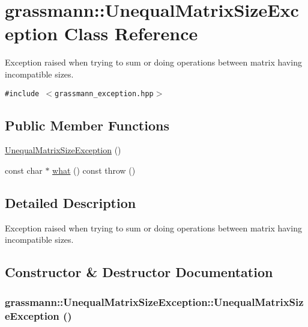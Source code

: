 \hypertarget{classgrassmann_1_1UnequalMatrixSizeException}{
\section{grassmann::UnequalMatrixSizeException Class Reference}
\label{classgrassmann_1_1UnequalMatrixSizeException}
}
Exception raised when trying to sum or doing operations between matrix having incompatible sizes.  


{\tt \#include $<$grassmann\_\-exception.hpp$>$}

\subsection*{Public Member Functions}
\begin{CompactItemize}
\item 
\hyperlink{classgrassmann_1_1UnequalMatrixSizeException_b0a801de9d1550a35c409bfecc919159}{UnequalMatrixSizeException} ()
\item 
const char $\ast$ \hyperlink{classgrassmann_1_1UnequalMatrixSizeException_06af655bdb0f47e75bbc6e4a72aad530}{what} () const   throw ()
\end{CompactItemize}


\subsection{Detailed Description}
Exception raised when trying to sum or doing operations between matrix having incompatible sizes. 

\subsection{Constructor \& Destructor Documentation}
\hypertarget{classgrassmann_1_1UnequalMatrixSizeException_b0a801de9d1550a35c409bfecc919159}{
\subsubsection[UnequalMatrixSizeException]{\setlength{\rightskip}{0pt plus 5cm}grassmann::UnequalMatrixSizeException::UnequalMatrixSizeException ()}}
\label{classgrassmann_1_1UnequalMatrixSizeException_b0a801de9d1550a35c409bfecc919159}




